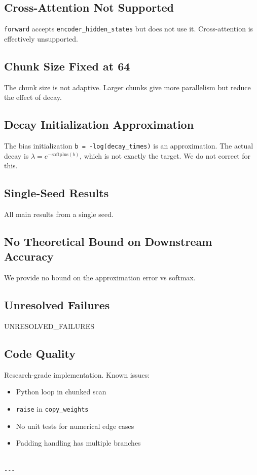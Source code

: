 \subsection{Cross-Attention Not Supported}

\texttt{forward} accepts \texttt{encoder\_hidden\_states} but does not use it. Cross-attention 
is effectively unsupported.

\subsection{Chunk Size Fixed at 64}

The chunk size is not adaptive. Larger chunks give more parallelism but 
reduce the effect of decay.

\subsection{Decay Initialization Approximation}

The bias initialization \texttt{b = -log(decay\_times)} is an approximation. The 
actual decay is $\lambda = e^{-\text{softplus}(b)}$, which is not exactly 
the target. We do not correct for this.

\subsection{Single-Seed Results}

All main results from a single seed.

\subsection{No Theoretical Bound on Downstream Accuracy}

We provide no bound on the approximation error vs softmax.

\subsection{Unresolved Failures}

{{UNRESOLVED\_FAILURES}}

\subsection{Code Quality}

Research-grade implementation. Known issues:
\begin{itemize}
\item Python loop in chunked scan
\item \texttt{raise} in \texttt{copy\_weights}
\item No unit tests for numerical edge cases
\item Padding handling has multiple branches
\end{itemize}
\begin{lstlisting}

---
\end{lstlisting}